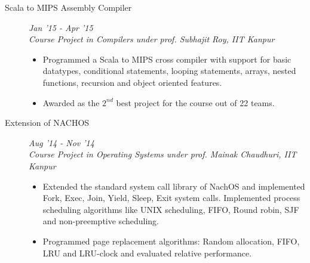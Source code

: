 \documentclass[9pt]{article}
\newenvironment{changemargin}[2]{%
  \begin{list}{}{%
      \setlength{\topsep}{0pt}%
    \setlength{\leftmargin}{#1}%
    \setlength{\rightmargin}{#2}%
    \setlength{\listparindent}{\parindent}%
  \setlength{\itemindent}{\parindent}%
    \setlength{\parsep}{\parskip}%
    }%
  \item[]}{\end{list}
    }
\newenvironment{body} {
  \vspace*{-16pt}
        \begin{changemargin}{-0.6in}{-0.65in}
        }	
        {\end{changemargin}
}
\begin{document}
\begin{body}
\begin{description}
  \item[\normalsize{Scala to MIPS Assembly Compiler}] \hfill \textit{Jan '15 - Apr '15} \\
    \textit{Course Project in Compilers under prof. Subhajit Roy, IIT Kanpur}
  \begin{itemize}
    \item Programmed a Scala to MIPS cross compiler with support for basic datatypes, conditional statements, looping statements, arrays, nested functions, recursion and object oriented features.
    \item Awarded as the $2^{nd}$ best project for the course out of 22 teams.
  \end{itemize}

\item[\normalsize{Extension of NACHOS}]  \hfill \textit{Aug '14 - Nov '14} \\
  \textit{Course Project in Operating Systems under prof. Mainak Chaudhuri, IIT Kanpur}
  \begin{itemize}
    \item Extended the standard system call library of NachOS and implemented Fork, Exec, Join, Yield, Sleep, Exit system calls.
      Implemented process scheduling algorithms like UNIX scheduling, FIFO, Round robin, SJF and non-preemptive scheduling.
    \item Programmed page replacement algorithms: Random allocation, FIFO, LRU and LRU-clock and evaluated relative performance.
  \end{itemize}

  \end{description}
  \smallskip
\end{body}
\end{document}
